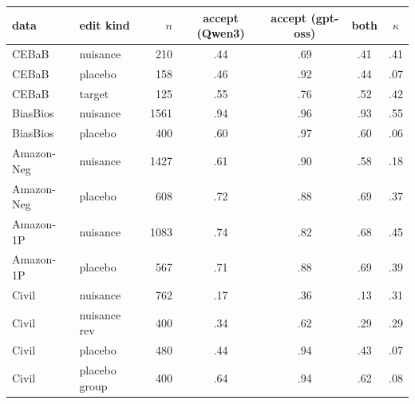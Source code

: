 \begin{tabular}{@{}llrcccc@{}}
\toprule
data & edit kind & $n$ & accept (Qwen3) & accept (gpt-oss) & both & $\kappa$ \\
\midrule
CEBaB & nuisance & 210 & .44 & .69 & .41 & .41 \\
CEBaB & placebo & 158 & .46 & .92 & .44 & .07 \\
CEBaB & target & 125 & .55 & .76 & .52 & .42 \\
BiasBios & nuisance & 1561 & .94 & .96 & .93 & .55 \\
BiasBios & placebo & 400 & .60 & .97 & .60 & .06 \\
Amazon-Neg & nuisance & 1427 & .61 & .90 & .58 & .18 \\
Amazon-Neg & placebo & 608 & .72 & .88 & .69 & .37 \\
Amazon-1P & nuisance & 1083 & .74 & .82 & .68 & .45 \\
Amazon-1P & placebo & 567 & .71 & .88 & .69 & .39 \\
Civil & nuisance & 762 & .17 & .36 & .13 & .31 \\
Civil & nuisance rev & 400 & .34 & .62 & .29 & .29 \\
Civil & placebo & 480 & .44 & .94 & .43 & .07 \\
Civil & placebo group & 400 & .64 & .94 & .62 & .08 \\
\bottomrule
\end{tabular}
